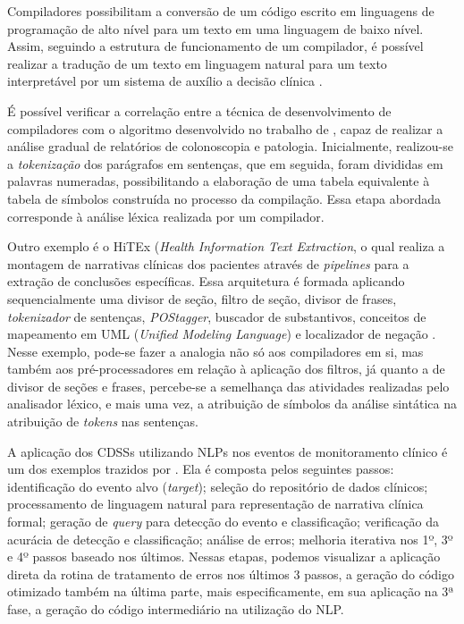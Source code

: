 \documentclass[12pt]{article}
\begin{document}
Compiladores possibilitam a conversão de um código escrito em linguagens de programação de alto nível para um texto em uma linguagem de baixo nível. Assim, seguindo a estrutura de funcionamento de um compilador, é possível realizar a tradução de um texto em linguagem natural para um texto interpretável por um sistema de auxílio a decisão clínica \cite{compiler_code_conversion}.

É possível verificar a correlação entre a técnica de desenvolvimento de compiladores com o algoritmo desenvolvido no trabalho de \cite{algorithm_cdss}, capaz de realizar a análise gradual de relatórios de colonoscopia e patologia. Inicialmente, realizou-se a \textit{tokenização} dos parágrafos em sentenças, que em seguida, foram divididas em palavras numeradas, possibilitando a elaboração de uma tabela equivalente à tabela de símbolos construída no processo da compilação. Essa etapa abordada corresponde à análise léxica realizada por um compilador. 

Outro exemplo é o HiTEx (\textit{Health Information Text Extraction}, o qual realiza a montagem de narrativas clínicas dos pacientes através de \textit{pipelines} para a extração de conclusões específicas. Essa arquitetura é formada aplicando sequencialmente uma divisor de seção, filtro de seção, divisor de frases, \textit{tokenizador} de sentenças, \textit{POStagger}, buscador de substantivos, conceitos de mapeamento em UML (\textit{Unified Modeling Language}) e localizador de negação \cite{what_can_nlp_cdss}. Nesse exemplo, pode-se fazer a analogia não só aos compiladores em si, mas também aos pré-processadores em relação à aplicação dos filtros, já quanto a de divisor de seções e frases, percebe-se a semelhança das atividades realizadas pelo analisador léxico, e mais uma vez, a atribuição de símbolos da análise sintática na atribuição de \textit{tokens} nas sentenças.

A aplicação dos CDSSs utilizando NLPs nos eventos de monitoramento clínico é um dos exemplos trazidos por \cite{what_can_nlp_cdss}. Ela é composta pelos seguintes passos: identificação do evento alvo (\textit{target}); seleção do repositório de dados clínicos; processamento de linguagem natural para representação de narrativa clínica formal; geração de \textit{query} para detecção do evento e classificação; verificação da acurácia de detecção e classificação; análise de erros; melhoria iterativa nos 1º, 3º e 4º passos baseado nos últimos. Nessas etapas, podemos visualizar a aplicação direta da rotina de tratamento de erros nos últimos 3 passos, a geração do código otimizado também na última parte, mais especificamente, em sua aplicação na 3ª fase, a geração do código intermediário na utilização do NLP.
 
\end{document}
